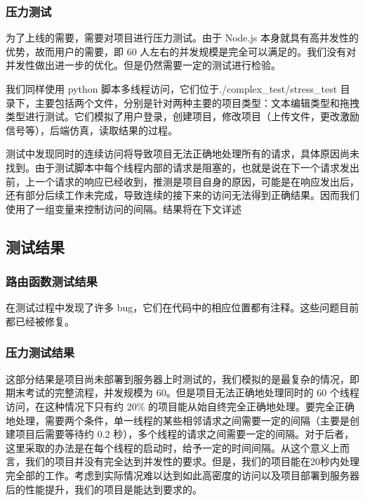         \subsubsection{压力测试}
            
            为了上线的需要，需要对项目进行压力测试。由于 Node.js 本身就具有高并发性的优势，故而用户的需要，即 60 人左右的并发规模是完全可以满足的。我们没有对并发性做出进一步的优化。但是仍然需要一定的测试进行检验。
            
            我们同样使用 python 脚本多线程访问，它们位于./complex\_test/stress\_test 目录下，主要包括两个文件，分别是针对两种主要的项目类型：文本编辑类型和拖拽类型进行测试。它们模拟了用户登录，创建项目，修改项目（上传文件，更改激励信号等），后端仿真，读取结果的过程。
            
            测试中发现同时的连续访问将导致项目无法正确地处理所有的请求，具体原因尚未找到。由于测试脚本中每个线程内部的请求是阻塞的，也就是说在下一个请求发出前，上一个请求的响应已经收到，推测是项目自身的原因，可能是在响应发出后，还有部分后续工作未完成，导致连续的接下来的访问无法得到正确结果。因而我们使用了一组变量来控制访问的间隔。结果将在下文详述
    \subsection{测试结果}
        \subsubsection{路由函数测试结果}
            在测试过程中发现了许多 bug，它们在代码中的相应位置都有注释。这些问题目前都已经被修复。
        \subsubsection{压力测试结果}
            这部分结果是项目尚未部署到服务器上时测试的，我们模拟的是最复杂的情况，即期末考试的完整流程，并发规模为 60。但是项目无法正确地处理同时的 60 个线程访问，在这种情况下只有约 20\% 的项目能从始自终完全正确地处理。要完全正确地处理，需要两个条件，单一线程的某些相邻请求之间需要一定的间隔（主要是创建项目后需要等待约 0.2 秒），多个线程的请求之间需要一定的间隔。对于后者，这里采取的办法是在每个线程的启动时，给予一定的时间间隔。从这个意义上而言，我们的项目并没有完全达到并发性的要求。但是，我们的项目能在20秒内处理完全部的工作。考虑到实际情况难以达到如此高密度的访问以及项目部署到服务器后的性能提升，我们的项目是能达到要求的。